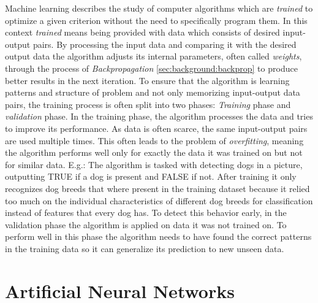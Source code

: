 Machine learning describes the study of computer algorithms which are \textit{trained} to optimize a given criterion without the need to specifically program them. In this context \textit{trained} means being provided with data which consists of desired input-output pairs. By processing the input data and comparing it with the desired output data the algorithm adjusts its internal parameters, often called \textit{weights}, through the process of \textit{Backpropagation} \ref{sec:background:backprop} to produce better results in the next iteration. To ensure that the algorithm is learning patterns and structure of problem and not only memorizing input-output data pairs, the training process is often split into two phases: \textit{Training} phase and \textit{validation} phase. In the training phase, the algorithm processes the data and tries to improve its performance. As data is often scarce, the same input-output pairs are used multiple times. This often leads to the problem of \textit{overfitting}, meaning the algorithm performs well only for exactly the data it was trained on but not for similar data. E.g.: The algorithm is tasked with detecting dogs in a picture, outputting TRUE if a dog is present and FALSE if not. After training it only recognizes dog breeds that where present in the training dataset because it relied too much on the individual characteristics of different dog breeds for classification instead of features that every dog has. To detect this behavior early, in the validation phase the algorithm is applied on data it was not trained on. To perform well in this phase the algorithm needs to have found the correct patterns in the training data so it can generalize its prediction to new unseen data.   

\section{Artificial Neural Networks} \label{sec:background:ann}

